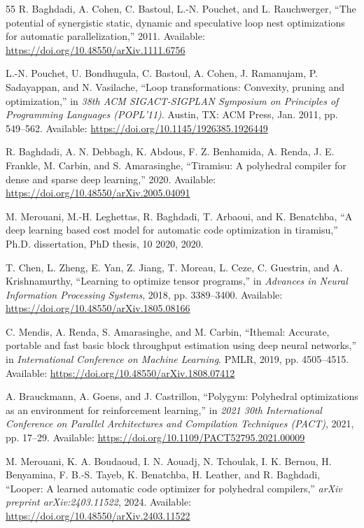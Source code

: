 \documentclass[10pt,twocolumn]{article}
\begin{document}
\begin{thebibliography}{55}
 R. Baghdadi, A. Cohen, C. Bastoul, L.-N. Pouchet, and L. Rauchwerger, ``The potential of synergistic static, dynamic and speculative loop nest optimizations for automatic parallelization,'' 2011. Available: \url{https://doi.org/10.48550/arXiv.1111.6756}

 L.-N. Pouchet, U. Bondhugula, C. Bastoul, A. Cohen, J. Ramanujam, P. Sadayappan, and N. Vasilache, ``Loop transformations: Convexity, pruning and optimization,'' in \emph{38th ACM SIGACT-SIGPLAN Symposium on Principles of Programming Languages (POPL'11)}. Austin, TX: ACM Press, Jan. 2011, pp. 549--562. Available: \url{https://doi.org/10.1145/1926385.1926449}

 R. Baghdadi, A. N. Debbagh, K. Abdous, F. Z. Benhamida, A. Renda, J. E. Frankle, M. Carbin, and S. Amarasinghe, ``Tiramisu: A polyhedral compiler for dense and sparse deep learning,'' 2020. Available: \url{https://doi.org/10.48550/arXiv.2005.04091}

 M. Merouani, M.-H. Leghettas, R. Baghdadi, T. Arbaoui, and K. Benatchba, ``A deep learning based cost model for automatic code optimization in tiramisu,'' Ph.D. dissertation, PhD thesis, 10 2020, 2020.

 T. Chen, L. Zheng, E. Yan, Z. Jiang, T. Moreau, L. Ceze, C. Guestrin, and A. Krishnamurthy, ``Learning to optimize tensor programs,'' in \emph{Advances in Neural Information Processing Systems}, 2018, pp. 3389--3400. Available: \url{https://doi.org/10.48550/arXiv.1805.08166}

 C. Mendis, A. Renda, S. Amarasinghe, and M. Carbin, ``Ithemal: Accurate, portable and fast basic block throughput estimation using deep neural networks,'' in \emph{International Conference on Machine Learning}. PMLR, 2019, pp. 4505--4515. Available: \url{https://doi.org/10.48550/arXiv.1808.07412}

 A. Brauckmann, A. Goens, and J. Castrillon, ``Polygym: Polyhedral optimizations as an environment for reinforcement learning,'' in \emph{2021 30th International Conference on Parallel Architectures and Compilation Techniques (PACT)}, 2021, pp. 17--29. Available: \url{https://doi.org/10.1109/PACT52795.2021.00009}

 M. Merouani, K. A. Boudaoud, I. N. Aouadj, N. Tchoulak, I. K. Bernou, H. Benyamina, F. B.-S. Tayeb, K. Benatchba, H. Leather, and R. Baghdadi, ``Looper: A learned automatic code optimizer for polyhedral compilers,'' \emph{arXiv preprint arXiv:2403.11522}, 2024. Available: \url{https://doi.org/10.48550/arXiv.2403.11522}


\end{thebibliography}
\end{document}
